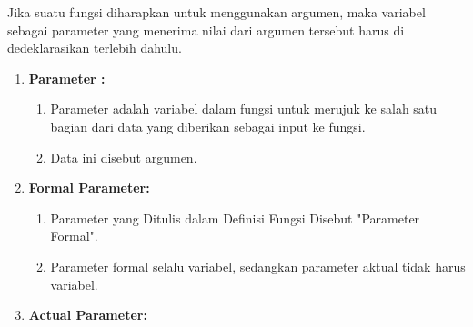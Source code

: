 Jika suatu fungsi diharapkan untuk menggunakan argumen, maka variabel sebagai parameter yang menerima nilai dari argumen tersebut harus di dedeklarasikan terlebih dahulu. \\
\begin{enumerate}
    \item  \textbf{Parameter :}
          \begin{enumerate}
              \item Parameter adalah variabel dalam fungsi untuk merujuk ke salah satu bagian dari
                    data yang diberikan sebagai input ke fungsi.
              \item Data ini disebut argumen.

          \end{enumerate}

    \item \textbf{Formal Parameter:}
          \begin{enumerate}
              \item Parameter yang Ditulis dalam Definisi Fungsi Disebut "Parameter Formal".
              \item Parameter formal selalu variabel, sedangkan parameter aktual tidak harus variabel.

          \end{enumerate}


    \item \textbf{Actual Parameter:}
          \begin{enumerate}


\end{enumerate}
\end{enumerate}
